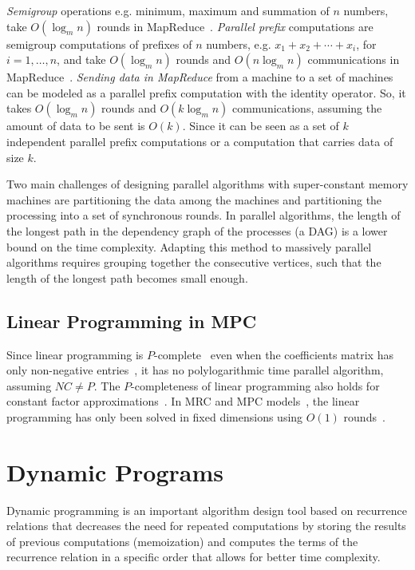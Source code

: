 \documentclass[preprint,12pt]{elsarticle}
\begin{document}
{\em Semigroup} operations e.g. minimum, maximum and summation of $n$ numbers, take $O(\log_m n)$ rounds in MapReduce~\cite{goodrich2011sorting}.
{\em Parallel prefix} computations are semigroup computations of prefixes of $n$ numbers, e.g. $x_1+x_2+\cdots+x_i$, for $i=1,\ldots,n$, and take $O(\log_m n)$ rounds and $O(n\log_m n)$ communications in MapReduce~\cite{goodrich2011sorting}.
{\em Sending data in MapReduce} from a machine to a set of machines can be modeled as a parallel prefix computation with the identity operator. So, it takes $O(\log_m n)$ rounds and $O(k\log_m n)$ communications, assuming the amount of data to be sent is $O(k)$. Since it can be seen as a set of $k$ independent parallel prefix computations or a computation that carries data of size $k$.

Two main challenges of designing parallel algorithms with super-constant memory machines are partitioning the data among the machines and partitioning the processing into a set of synchronous rounds. In parallel algorithms, the length of the longest path in the dependency graph of the processes (a DAG) is a lower bound on the time complexity. Adapting this method to massively parallel algorithms requires grouping together the consecutive vertices, such that the length of the longest path becomes small enough.

\subsection{Linear Programming in MPC}
Since linear programming is $P$-complete~\cite{dobkin1979linear} even when the coefficients matrix has only non-negative entries~\cite{trevisan1998parallel}, it has no polylogarithmic time parallel algorithm, assuming $NC\neq P$. The $P$-completeness of linear programming also holds for constant factor approximations~\cite{serna1991approximating,greenlaw1995limits}.
In MRC and MPC models~\cite{mrc,mpc}, the linear programming has only been solved in fixed dimensions using $O(1)$ rounds~\cite{goodrich2011sortingI}.

\section{Dynamic Programs}
Dynamic programming is an important algorithm design tool based on recurrence relations that decreases the need for repeated computations by storing the results of previous computations (memoization) and computes the terms of the recurrence relation in a specific order that allows for better time complexity.
\end{document}
